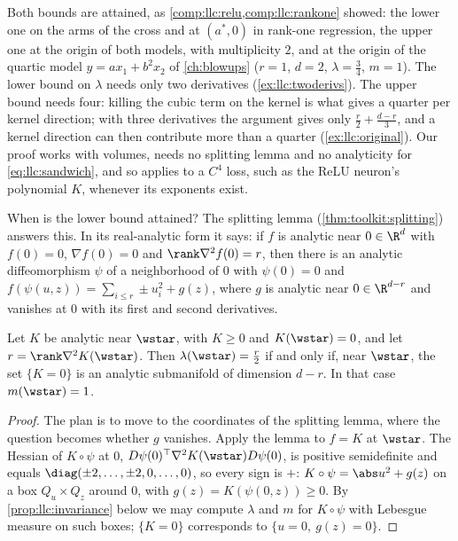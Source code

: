 \begin{refsection}
Both bounds are attained, as \cref{comp:llc:relu,comp:llc:rankone} showed: the lower one on the arms of the cross and at $(a^*,0)$ in rank-one regression, the upper one at the origin of both models, with multiplicity $2$, and at the origin of the quartic model $y=ax_1+b^2x_2$ of \cref{ch:blowups} ($r=1$, $d=2$, $\lambda=\tfrac34$, $m=1$). The lower bound on $\lambda$ needs only two derivatives (\cref{ex:llc:twoderivs}). The upper bound needs four: killing the cubic term on the kernel is what gives a quarter per kernel direction; with three derivatives the argument gives only $\tfrac r2+\tfrac{d-r}3$, and a kernel direction can then contribute more than a quarter (\cref{ex:llc:original}). Our proof works with volumes, needs no splitting lemma and no analyticity for \eqref{eq:llc:sandwich}, and so applies to a $C^4$ loss, such as the ReLU neuron's polynomial $K$, whenever its exponents exist.

When is the lower bound attained? The splitting lemma (\cref{thm:toolkit:splitting}) answers this. In its real-analytic form it says: if $f$ is analytic near $0\in\R^d$ with $f(0)=0$, $\nabla f(0)=0$ and $\rank\nabla^2f(0)=r$, then there is an analytic diffeomorphism $\psi$ of a neighborhood of $0$ with $\psi(0)=0$ and $f(\psi(u,z))=\sum_{i\le r}\pm u_i^2+g(z)$, where $g$ is analytic near $0\in\R^{d-r}$ and vanishes at $0$ with its first and second derivatives.

\begin{corollary}\label{cor:llc:minimal}
Let $K$ be analytic near $\wstar$, with $K\ge0$ and $K(\wstar)=0$, and let $r=\rank\nabla^2K(\wstar)$. Then $\lambda(\wstar)=\tfrac r2$ if and only if, near $\wstar$, the set $\{K=0\}$ is an analytic submanifold of dimension $d-r$. In that case $m(\wstar)=1$.
\end{corollary}

\begin{proof}
The plan is to move to the coordinates of the splitting lemma, where the question becomes whether $g$ vanishes. Apply the lemma to $f=K$ at $\wstar$. The Hessian of $K\circ\psi$ at $0$, $D\psi(0)^\top\nabla^2K(\wstar)D\psi(0)$, is positive semidefinite and equals $\diag(\pm2,\dots,\pm2,0,\dots,0)$, so every sign is $+$: $K\circ\psi=\abs u^2+g(z)$ on a box $Q_u\times Q_z$ around $0$, with $g(z)=K(\psi(0,z))\ge0$. By \cref{prop:llc:invariance} below we may compute $\lambda$ and $m$ for $K\circ\psi$ with Lebesgue measure on such boxes; $\{K=0\}$ corresponds to $\{u=0,\ g(z)=0\}$.


\end{proof}
\end{refsection}
